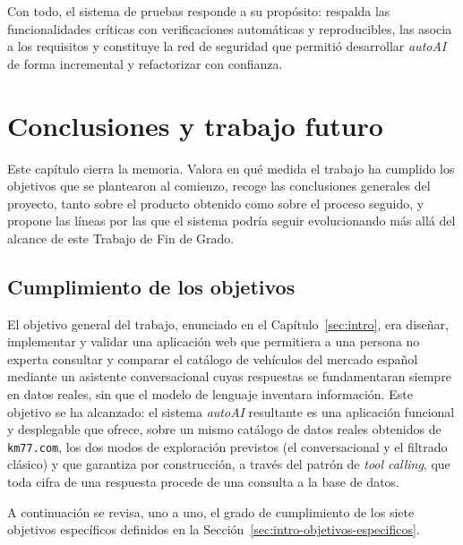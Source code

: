 Con todo, el sistema de pruebas responde a su propósito: respalda las
funcionalidades críticas con verificaciones automáticas y reproducibles, las
asocia a los requisitos y constituye la red de seguridad que permitió desarrollar
\emph{autoAI} de forma incremental y refactorizar con confianza.


\chapter{Conclusiones y trabajo futuro}
\label{cap:conclusiones}

Este capítulo cierra la memoria. Valora en qué medida el trabajo ha cumplido los
objetivos que se plantearon al comienzo, recoge las conclusiones generales del
proyecto, tanto sobre el producto obtenido como sobre el proceso seguido, y
propone las líneas por las que el sistema podría seguir evolucionando más allá del
alcance de este Trabajo de Fin de Grado.

\section{Cumplimiento de los objetivos}
\label{sec:concl-cumplimiento}

El objetivo general del trabajo, enunciado en el Capítulo~\ref{sec:intro}, era
diseñar, implementar y validar una aplicación web que permitiera a una persona no
experta consultar y comparar el catálogo de vehículos del mercado español mediante
un asistente conversacional cuyas respuestas se fundamentaran siempre en datos
reales, sin que el modelo de lenguaje inventara información. Este objetivo se ha
alcanzado: el sistema \emph{autoAI} resultante es una aplicación funcional y
desplegable que ofrece, sobre un mismo catálogo de datos reales obtenidos de
\texttt{km77.com}, los dos modos de exploración previstos (el conversacional y el
filtrado clásico) y que garantiza por construcción, a través del patrón de
\emph{tool calling}, que toda cifra de una respuesta procede de una consulta a la
base de datos.

A continuación se revisa, uno a uno, el grado de cumplimiento de los siete
objetivos específicos definidos en la Sección~\ref{sec:intro-objetivos-especificos}.


